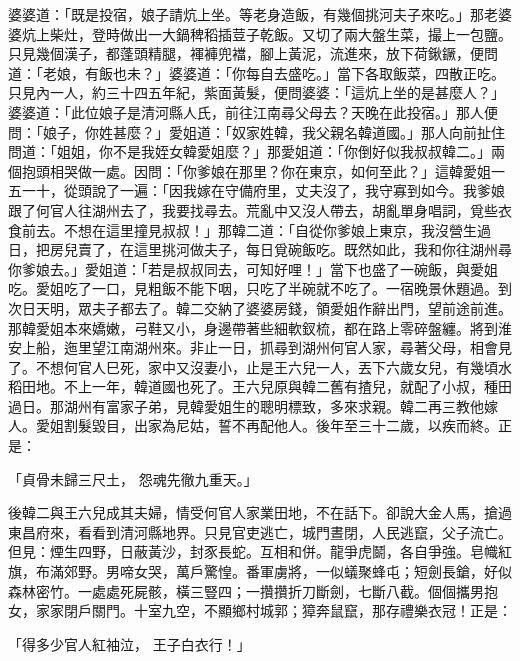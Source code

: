 婆婆道：「既是投宿，娘子請炕上坐。等老身造飯，有幾個挑河夫子來吃。」那老婆婆炕上柴灶，登時做出一大鍋稗稻插荳子乾飯。又切了兩大盤生菜，撮上一包鹽。只見幾個漢子，都蓬頭精腿，褌褲兜襠，腳上黃泥，流進來，放下荷鍬鐝，便問道：「老娘，有飯也未？」婆婆道：「你每自去盛吃。」當下各取飯菜，四散正吃。只見內一人，約三十四五年紀，紫面黃髮，便問婆婆：「這炕上坐的是甚麼人？」婆婆道：「此位娘子是清河縣人氏，前往江南尋父母去？天晚在此投宿。」那人便問：「娘子，你姓甚麼？」愛姐道：「奴家姓韓，我父親名韓道國。」那人向前扯住問道：「姐姐，你不是我姪女韓愛姐麼？」那愛姐道：「你倒好似我叔叔韓二。」兩個抱頭相哭做一處。因問：「你爹娘在那里？你在東京，如何至此？」這韓愛姐一五一十，從頭說了一遍：「因我嫁在守備府里，丈夫沒了，我守寡到如今。我爹娘跟了何官人往湖州去了，我要找尋去。荒亂中又沒人帶去，胡亂單身唱詞，覓些衣食前去。不想在這里撞見叔叔！」那韓二道：「自從你爹娘上東京，我沒營生過日，把房兒賣了，在這里挑河做夫子，每日覓碗飯吃。既然如此，我和你往湖州尋你爹娘去。」愛姐道：「若是叔叔同去，可知好哩！」當下也盛了一碗飯，與愛姐吃。愛姐吃了一口，見粗飯不能下咽，只吃了半碗就不吃了。一宿晚景休題過。到次日天明，眾夫子都去了。韓二交納了婆婆房錢，領愛姐作辭出門，望前途前進。那韓愛姐本來嬌嫩，弓鞋又小，身邊帶著些細軟釵梳，都在路上零碎盤纏。將到淮安上船，迤里望江南湖州來。非止一日，抓尋到湖州何官人家，尋著父母，相會見了。不想何官人巳死，家中又沒妻小，止是王六兒一人，丟下六歲女兒，有幾頃水稻田地。不上一年，韓道國也死了。王六兒原與韓二舊有揸兒，就配了小叔，種田過日。那湖州有富家子弟，見韓愛姐生的聰明標致，多來求親。韓二再三教他嫁人。愛姐割髮毀目，出家為尼姑，誓不再配他人。後年至三十二歲，以疾而終。正是：

「貞骨未歸三尺土，  怨魂先徹九重天。」

後韓二與王六兒成其夫婦，情受何官人家業田地，不在話下。卻說大金人馬，搶過東昌府來，看看到清河縣地界。只見官吏逃亡，城門晝閉，人民逃竄，父子流亡。但見：煙生四野，日蔽黃沙，封豕長蛇。互相和併。龍爭虎鬬，各自爭強。皂幟紅旗，布滿郊野。男啼女哭，萬戶驚惶。番軍虜將，一似蟻聚蜂屯；短劍長鎗，好似森林密竹。一處處死屍骸，橫三豎四；一攢攢折刀斷劍，七斷八截。個個攜男抱女，家家閉戶關門。十室九空，不顯鄉村城郭；獐奔鼠竄，那存禮樂衣冠！正是：

「得多少官人紅袖泣，  王子白衣行！」

